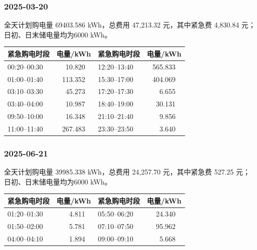 \subsubsection*{2025-03-20}

\begin{center}\small\quad\end{center}
全天计划购电量 69403.586 kWh，总费用 47,213.32 元，其中紧急费 4,830.84 元；日初、日末储电量均为6000 kWh。
\begin{center}\small
\begin{tabular}{lrlr}\toprule
紧急购电时段 & 电量/kWh & 紧急购电时段 & 电量/kWh\\\midrule
00:20--00:30 & 10.820 \ & 12:20--13:40 & 565.833 \ \\
01:00--01:40 & 113.352 \ & 15:30--17:00 & 404.069 \ \\
03:10--03:30 & 45.273 \ & 17:20--17:30 & 6.655 \ \\
03:40--04:00 & 10.987 \ & 18:40--19:00 & 30.131 \ \\
09:50--10:00 & 16.348 \ & 21:10--21:40 & 9.856 \ \\
11:00--11:40 & 267.483 \ & 23:30--23:50 & 3.640 \ \\
\bottomrule\end{tabular}\end{center}

\subsubsection*{2025-06-21}

\begin{center}\small\quad\end{center}
全天计划购电量 39985.338 kWh，总费用 24,257.70 元，其中紧急费 527.25 元；日初、日末储电量均为6000 kWh。
\begin{center}\small
\begin{tabular}{lrlr}\toprule
紧急购电时段 & 电量/kWh & 紧急购电时段 & 电量/kWh\\\midrule
01:20--01:30 & 4.811 \ & 05:50--06:20 & 24.340 \ \\
01:50--02:00 & 5.781 \ & 07:10--07:50 & 95.962 \ \\
04:00--04:10 & 1.894 \ & 09:00--09:10 & 5.668 \ \\
\bottomrule\end{tabular}\end{center}

